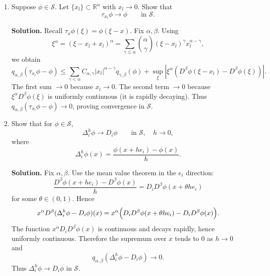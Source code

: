 \documentclass[12pt,a4paper]{article}
\theoremstyle{plain}
\theoremstyle{definition}
\theoremstyle{remark}
\theoremstyle{remark}
\begin{document}
\begin{enumerate}
	
	\item[(a)]
	Suppose $\phi\in\mathcal{S}$.  Let $\{x_l\}\subset\mathbb{R}^n$ with $x_l\to 0$.
	Show that
	\[
	\tau_{x_l}\phi \to \phi \qquad\text{in }\mathcal{S}.
	\]
	
	\medskip
	\textbf{Solution.}
	Recall $\tau_{x}\phi(\xi)=\phi(\xi-x)$.
	Fix $\alpha,\beta$.  Using
	\[
	\xi^\alpha = (\xi-x_l+x_l)^\alpha =
	\sum_{\gamma\le\alpha} \binom{\alpha}{\gamma}
	(\xi-x_l)^\gamma x_l^{\alpha-\gamma},
	\]
	we obtain
	\[
	q_{\alpha,\beta}(\tau_{x_l}\phi - \phi)
	\le \sum_{\gamma<\alpha} C_{\alpha,\gamma}
	|x_l|^{\alpha-\gamma} q_{\gamma,\beta}(\phi)
	+ \sup_{\xi}
	|\xi^\alpha (D^\beta\phi(\xi-x_l)-D^\beta\phi(\xi))|.
	\]
	The first sum $\to 0$ because $x_l\to 0$.  
	The second term $\to 0$ because
	$\xi^\alpha D^\beta\phi(\xi)$ is uniformly continuous
	(it is rapidly decaying).  
	Thus $q_{\alpha,\beta}(\tau_{x_l}\phi-\phi)\to 0$, proving convergence in
	$\mathcal{S}$.
	
	\item[(b)]
	Show that for $\phi\in\mathcal{S}$,
	\[
	\Delta_i^h\phi \to D_i\phi \qquad\text{in }\mathcal{S},
	\quad h\to 0,
	\]
	where
	\[
	\Delta_i^h\phi(x)
	= \frac{\phi(x+he_i)-\phi(x)}{h}.
	\]
	
	\medskip
	\textbf{Solution.}
	Fix $\alpha,\beta$.  Use the mean value theorem in the $e_i$ direction:
	\[
	\frac{D^\beta\phi(x+he_i)-D^\beta\phi(x)}{h}
	= D_iD^\beta\phi(x+\theta h e_i)
	\]
	for some $\theta\in(0,1)$.  
	Hence
	\[
	x^\alpha D^\beta(\Delta_i^h\phi - D_i\phi)(x)
	= x^\alpha\Bigl(D_iD^\beta\phi(x+\theta h e_i)
	- D_iD^\beta\phi(x)\Bigr).
	\]
	The function $x^\alpha D_iD^\beta\phi(x)$ is continuous and decays
	rapidly, hence uniformly continuous.  
	Therefore the supremum over $x$ tends to $0$ as $h\to0$ and
	\[
	q_{\alpha,\beta}(\Delta_i^h\phi - D_i\phi)\to 0.
	\]
	Thus $\Delta_i^h\phi\to D_i\phi$ in $\mathcal{S}$.
	
\end{enumerate}
\end{document}
